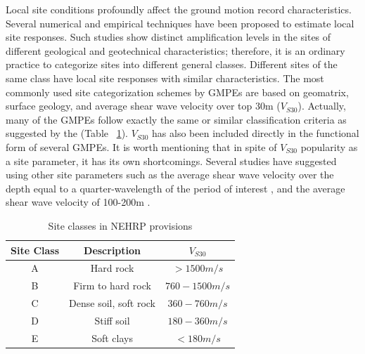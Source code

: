 Local site conditions profoundly affect the ground motion record
characteristics. Several numerical and empirical techniques have
been proposed to estimate local site responses. Such studies show
distinct amplification levels in the sites of different geological
and geotechnical characteristics; therefore, it is an ordinary
practice to categorize sites into different general classes.
Different sites of the same class have local site responses with
similar characteristics. The most commonly used site categorization
schemes by GMPEs are based on geomatrix, surface geology, and
average shear wave velocity over top 30m ($V_{S30}$). Actually, many
of the GMPEs follow exactly the same or similar classification
criteria as suggested by the \citet{eqrm_NEHRP00} (Table
~\ref{NEHRP}). $V_{S30}$ has also been included directly in the
functional form of several GMPEs. It is worth mentioning that in
spite of $V_{S30}$ popularity as a site parameter, it has its own
shortcomings. Several studies have suggested using other site
parameters such as the average shear wave velocity over the depth
equal to a quarter-wavelength of the period of interest
\citep{eqrm_Boore91}, and the average shear wave velocity of
100-200m \citep{eqrm_Lee95}.
\begin{table}[!t]
\renewcommand{\arraystretch}{1.3}
\caption{Site classes in NEHRP provisions} \label{NEHRP} \centering
\begin{tabular}{|c|c|c|}
\hline
Site Class & Description & $V_{S30}$\\
\hline
A & Hard rock & $>1500 m/s$\\
\hline
B & Firm to hard rock & $760-1500 m/s$\\
\hline
C & Dense soil, soft rock & $360-760 m/s$\\
\hline
D & Stiff soil & $180-360 m/s$\\
\hline
E & Soft clays & $<180 m/s$\\
\hline
\end{tabular}
\end{table}

